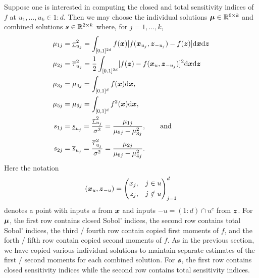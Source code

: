 \documentclass{article}[12pt]
\begin{document}
Suppose one is interested in computing the closed and total sensitivity indices of $f$ at $u_1,\dots,u_k \in 1:d$.  Then we may choose the individual solutions $\boldsymbol{\mu} \in \mathbb{R}^{6 \times k}$ and combined solutions $\boldsymbol{s} \in \mathbb{R}^{2 \times k}$ where, for $j=1,\dots,k$,
\begin{align*}
    \mu_{1j} &= \underline{\tau}_{u_j}^2 = \int_{[0,1]^{2d}} f(\boldsymbol{x})[f(\boldsymbol{x}_{u_j},\boldsymbol{z}_{-{u_j}})-f(\boldsymbol{z})]\mathrm{d}\boldsymbol{x}\mathrm{d}\boldsymbol{z} \\
    \mu_{2j} &= \overline{\tau}_{u_j}^2 = \frac{1}{2}\int_{[0,1]^{2d}} [f(\boldsymbol{z})-f(\boldsymbol{x}_u,\boldsymbol{z}_{-{u_j}})]^2\mathrm{d}\boldsymbol{x}\mathrm{d}\boldsymbol{z} \\
    \mu_{3j} &= \mu_{4j} = \int_{[0,1]^d} f(\boldsymbol{x})\mathrm{d}\boldsymbol{x}, \\
    \mu_{5j} &= \mu_{6j} = \int_{[0,1]^d} f^2(\boldsymbol{x})\mathrm{d}\boldsymbol{x}, \\
    s_{1j} &= \underline{s}_{u_j} = \frac{\underline{\tau}_{u_j}^2}{\sigma^2} = \frac{\mu_{1j}}{\mu_{5j}-\mu_{3j}^2}, \qquad \text{and} \\
    s_{2j} &= \overline{s}_{u_j} = \frac{\overline{\tau}_{u_j}^2}{\sigma^2} = \frac{\mu_{2j}}{\mu_{6j}-\mu_{4j}^2}.  
\end{align*}
Here the notation
\begin{equation}
    (\boldsymbol{x}_{u},\boldsymbol{z}_{-u}) = \left(\begin{aligned}x_{j}, \quad & j \in u \\ z_{j}, \quad & j \notin u \end{aligned}\right)_{j=1}^d
\end{equation}
denotes a point with inputs $u$ from $\boldsymbol{x}$ and inputs $-u=(1:d)\cap u^c$ from $\boldsymbol{z}$.
For $\boldsymbol{\mu}$, the first row contains closed Sobol' indices, the second row contains total Sobol' indices, the third / fourth row contain copied first moments of $f$, and the forth / fifth row contain copied second moments of $f$. As in the previous section, we have copied various individual solutions to maintain separate estimates of the first / second moments for each combined solution. For $\boldsymbol{s}$, the first row contains closed sensitivity indices while the second row contains total sensitivity indices. 
\end{document}
